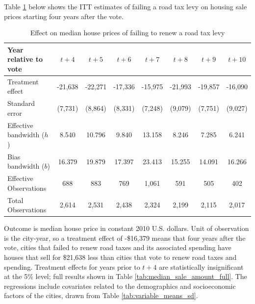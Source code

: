  Table \ref{tab:median_sale_amount} below shows the ITT estimates of failing a road tax levy on housing sale prices starting four years after the vote. 

 \begin{table}[ht]
    \centering
    \caption{Effect on median house prices of failing to renew a road tax levy}
    \label{tab:median_sale_amount}
    \begin{tabular}{p{2cm}ccccccc}
        \hline
        Year relative to vote & $t + 4$ & $t + 5$ & $t + 6$ & $t + 7$ & $t + 8$ & $t + 9$ & $t + 10$ \\
        \hline
        Treatment effect & -21,638 & -22,271 & -17,336 & -15,975 & -21,993 & -19,857 & -16,090 \\
        Standard error   & (7,731) & (8,864) & (8,331) & (7,248) & (9,079) & (7,751) & (9,027) \\
        Effective bandwidth ($h$) & 8.540 & 10.796 & 9.840 & 13.158 & 8.246 & 7.285 & 6.241 \\
        Bias bandwidth ($b$) & 16.379 & 19.879 & 17.397 & 23.413 & 15.255 & 14.091 & 16.266 \\
        Effective Observations & 688 & 883 & 769 & 1,061 & 591 & 505 & 402 \\
        Total Observations & 2,614 & 2,531 & 2,438 & 2,324 & 2,199 & 2,115 & 2,017 \\
        \hline
    \end{tabular}
    \begin{tablenotes}
        \small
        \item Outcome is median house price in constant 2010 U.S. dollars. Unit of observation is the city-year, so a treatment effect of -\$16,379 means that four years after the vote, cities that failed to renew road taxes and its associated spending have houses that sell for \$21,638 less than cities that vote to renew road taxes and spending. Treatment effects for years prior to $t + 4$ are statistically insignificant at the 5\% level; full results shown in Table \ref{tab:median_sale_amount_full}. The regressions include covariates related to the demographics and socioeconomic factors of the cities, drawn from Table \ref{tab:variable_means_sd}.
    \end{tablenotes}
\end{table}


